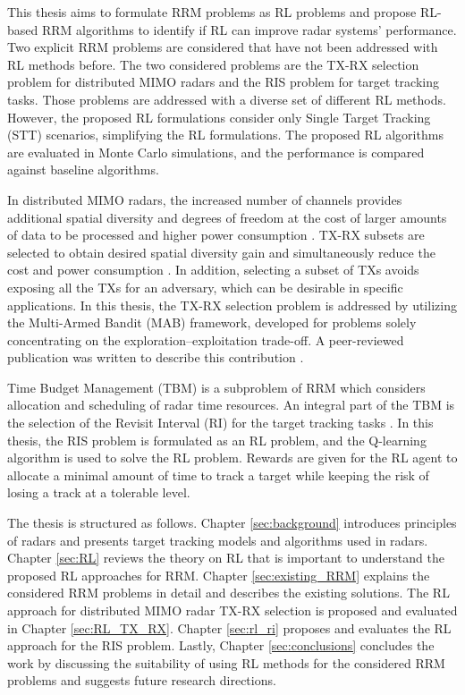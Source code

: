 \documentclass[english, 12pt, a4paper, elec, utf8, a-1b, online]{aaltothesis}
\numberwithin{equation}{section}
\begin{document}
This thesis aims to formulate RRM problems as RL problems and propose RL-based RRM algorithms to identify if RL can improve radar systems' performance.
Two explicit RRM problems are considered that have not been addressed with RL methods before.
The two considered problems are the TX-RX selection problem for distributed MIMO radars and the RIS problem for target tracking tasks.
Those problems are addressed with a diverse set of different RL methods.
However, the proposed RL formulations consider only Single Target Tracking (STT) scenarios, simplifying the RL formulations. 
The proposed RL algorithms are evaluated in Monte Carlo simulations, and the performance is compared against baseline algorithms.

In distributed MIMO radars, the increased number of channels provides additional spatial diversity and degrees of freedom at the cost of larger amounts of data to be processed and higher power consumption \cite{Haimovich2008, Aittomäki2011}.
TX-RX subsets are selected to obtain desired spatial diversity gain and simultaneously reduce the cost and power consumption \cite{Godrich2011a, Godrich2011, Sun2014}.
In addition, selecting a subset of TXs avoids exposing all the TXs for an adversary, which can be desirable in specific applications.
In this thesis, the TX-RX selection problem is addressed by utilizing the Multi-Armed Bandit (MAB) framework, developed for problems solely concentrating on the exploration--exploitation trade-off. 
A peer-reviewed publication was written to describe this contribution \cite{Pulkkinen2020}.

Time Budget Management (TBM) is a subproblem of RRM which considers allocation and scheduling of radar time resources.
An integral part of the TBM is the selection of the Revisit Interval (RI) for the target tracking tasks \cite{Cohen1986, Gardner1988, Munu1992, ChengTing2007, Baek2010, Watson1993, Charlish2015, Keuk1975, Shin1995, Benoudnine2006}.
In this thesis, the RIS problem is formulated as an RL problem, and the Q-learning algorithm is used to solve the RL problem.
Rewards are given for the RL agent to allocate a minimal amount of time to track a target while keeping the risk of losing a track at a tolerable level.

The thesis is structured as follows. 
Chapter \ref{sec:background} introduces principles of radars and presents target tracking models and algorithms used in radars.
Chapter \ref{sec:RL} reviews the theory on RL that is important to understand the proposed RL approaches for RRM. 
Chapter \ref{sec:existing_RRM} explains the considered RRM problems in detail and describes the existing solutions.
The RL approach for distributed MIMO radar TX-RX selection is proposed and evaluated in Chapter \ref{sec:RL_TX_RX}. 
Chapter \ref{sec:rl_ri} proposes and evaluates the RL approach for the RIS problem.
Lastly, Chapter \ref{sec:conclusions} concludes the work by discussing the suitability of using RL methods for the considered RRM problems and suggests future research directions.
\end{document}
